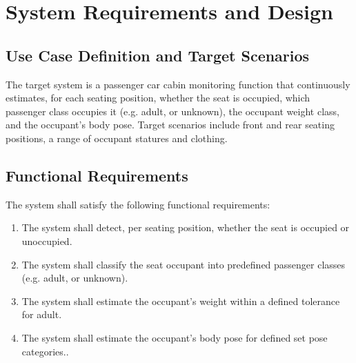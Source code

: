 \chapter{System Requirements and Design}
\label{ch:system-requirements}

\section{Use Case Definition and Target Scenarios}
\label{sec:use-case-definition}
The target system is a passenger car cabin monitoring function that
continuously estimates, for each seating position, whether the seat is
occupied, which passenger class occupies it (e.g. adult, or unknown), the occupant weight class, and the occupant's
body pose. Target scenarios include front and rear seating positions, a range of occupant
statures and clothing.



\section{Functional Requirements}
\label{sec:functional-requirements}
The system shall satisfy the following functional requirements:
\begin{enumerate}
    \item[\textbf{FR-01}] The system shall detect, per seating position,
    whether the seat is occupied or unoccupied.
    \item[\textbf{FR-02}] The system shall classify the seat occupant into
    predefined passenger classes (e.g. adult, or unknown).
    \item[\textbf{FR-03}] The system shall estimate the occupant's weight
    within a defined tolerance for adult.
    \item[\textbf{FR-04}] The system shall estimate the occupant's body
    pose for defined set  pose categories..
\end{enumerate}


